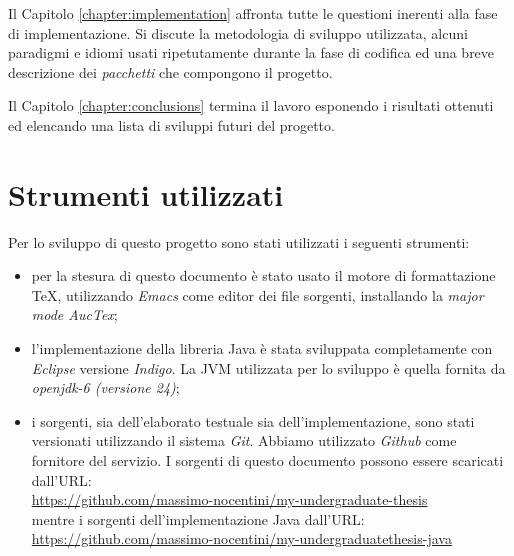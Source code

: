 Il Capitolo \ref{chapter:implementation} affronta tutte le questioni
inerenti alla fase di implementazione. Si discute la metodologia di
sviluppo utilizzata, alcuni paradigmi e idiomi usati ripetutamente
durante la fase di codifica ed una breve descrizione dei
\emph{pacchetti} che compongono il progetto.

Il Capitolo \ref{chapter:conclusions} termina il lavoro esponendo i
risultati ottenuti ed elencando una lista di sviluppi futuri del
progetto.

\section{Strumenti utilizzati}
Per lo sviluppo di questo progetto sono stati utilizzati i seguenti
strumenti:
\begin{itemize}
\item per la stesura di questo documento \`e stato usato il motore di
  formattazione \TeX, utilizzando \emph{Emacs} come editor dei file
  sorgenti, installando la \emph{major mode AucTex};
\item l'implementazione della libreria Java \`e stata sviluppata
  completamente con \emph{Eclipse} versione \emph{Indigo}. La JVM
  utilizzata per lo sviluppo \`e quella fornita da \emph{openjdk-6
    (versione 24)};
\item i sorgenti, sia dell'elaborato testuale sia
  dell'implementazione, sono stati versionati utilizzando il sistema
  \emph{Git}. Abbiamo utilizzato \emph{Github} come fornitore del
  servizio. I sorgenti di questo documento possono essere scaricati
  dall'URL:\\
  \href{https://github.com/massimo-nocentini/my-undergraduate-thesis}{
    https://github.com/massimo-nocentini/my-undergraduate-thesis}\\
  mentre i sorgenti dell'implementazione Java dall'URL:\\
  \href{https://github.com/massimo-nocentini/my-undergraduatethesis-java}{
    https://github.com/massimo-nocentini/my-undergraduatethesis-java}
\end{itemize}

